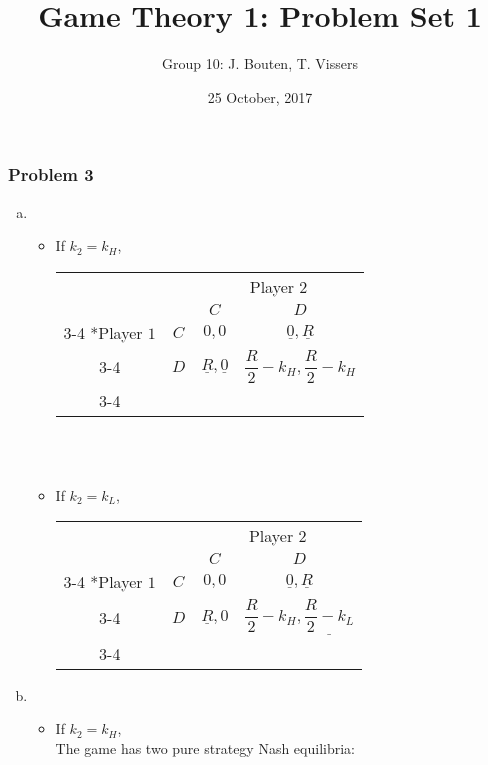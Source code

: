 \documentclass[a4paper]{article}
\author{Group 10: J. Bouten, T. Vissers}
\date{25 October, 2017}
\title{Game Theory 1: Problem Set 1}
\begin{document}
\maketitle



\subsubsection{Problem 3}
\begin{enumerate}[(a)]
\item
\begin{itemize}
\item If $k_2=k_H$,\\
{\renewcommand{\arraystretch}{2}
\begin{tabular}{cc|c|c|}
      & \multicolumn{1}{c}{} & \multicolumn{2}{c}{Player $2$}\\
      & \multicolumn{1}{c}{} & \multicolumn{1}{c}{$C$}  & \multicolumn{1}{c}{$D$} \\\cline{3-4}
      \multirow{2}*{Player $1$}  & $C$ & $0,0$ & $\underline{0},\underline{R}$ \\\cline{3-4}
      & $D$ & $\underline{R},\underline{0}$ & $\dfrac{R}{2}-k_H,\dfrac{R}{2}-k_H$ \\\cline{3-4}
\end{tabular}
}\\
\\
\item If $k_2=k_L$,\\
{\renewcommand{\arraystretch}{2}
\begin{tabular}{cc|c|c|}
      & \multicolumn{1}{c}{} & \multicolumn{2}{c}{Player $2$}\\
      & \multicolumn{1}{c}{} & \multicolumn{1}{c}{$C$}  & \multicolumn{1}{c}{$D$} \\\cline{3-4}
      \multirow{2}*{Player $1$}  & $C$ & $0,0$ & $\underline{0},\underline{R}$ \\\cline{3-4}
      & $D$ & $\underline{R},0$ & $\dfrac{R}{2}-k_H,\underline{\dfrac{R}{2}-k_L}$ \\\cline{3-4}
\end{tabular}
}
\end{itemize}
\item
\begin{itemize}
\item
If $k_2=k_H$,\\
The game has two pure strategy Nash equilibria:


\end{itemize}
\end{enumerate}
\end{document}

